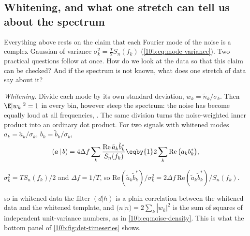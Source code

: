 \subsection{Whitening, and what one stretch can tell us about the spectrum}
\label{10b:sec:welch}

Everything above rests on the claim that each Fourier mode of the noise is a complex Gaussian of variance
$\sigma_k^2=\tfrac T2S_n(f_k)$ (\cref{10b:eq:mode-variance}). Two practical questions follow at once. How do we
look at the data so that this claim can be checked? And if the spectrum is not known, what does one stretch of data say about it?

\emph{Whitening.} Divide each mode by its own standard deviation, $w_k=\tilde n_k/\sigma_k$. Then
$\E|w_k|^2=1$ in every bin, however steep the spectrum: the noise has become equally loud at all frequencies,
. The same division turns the noise-weighted inner product into an ordinary dot product. For two
signals with whitened modes $a_k=\tilde a_k/\sigma_k$, $b_k=\tilde b_k/\sigma_k$,
\begin{equation}
  (a\,|\,b)=4\Delta f\sum_k\frac{\mathrm{Re}\,\tilde a_k\tilde b_k^*}{S_n(f_k)}
  \eqby{1}2\sum_k\mathrm{Re}\,\big(a_kb_k^*\big),
  \label{10b:eq:whitened-ip}
\end{equation}
\begin{explain}
  \item $\sigma_k^2=T S_n(f_k)/2$ and $\Delta f=1/T$, so $\mathrm{Re}(\tilde a_k\tilde b_k^*)/\sigma_k^2=2\Delta f\,\mathrm{Re}(\tilde a_k\tilde b_k^*)/S_n(f_k)$.
\end{explain}
so in whitened data the filter $(d|h)$ is a plain correlation between the whitened data and the whitened template,
and $(n|n)=2\sum_k|w_k|^2$ is the sum of squares of independent unit-variance numbers, as in
\eqref{10b:eq:noise-density}. This is what the bottom panel of \cref{10b:fig:det-timeseries} shows.

